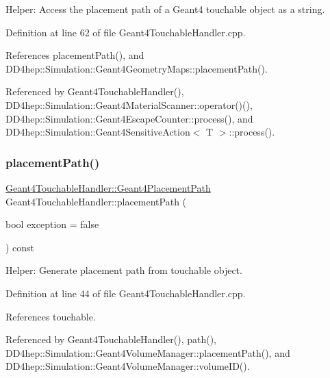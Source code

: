 Helper\+: Access the placement path of a Geant4 touchable object as a string. 



Definition at line 62 of file Geant4\+Touchable\+Handler.\+cpp.



References placement\+Path(), and D\+D4hep\+::\+Simulation\+::\+Geant4\+Geometry\+Maps\+::placement\+Path().



Referenced by Geant4\+Touchable\+Handler(), D\+D4hep\+::\+Simulation\+::\+Geant4\+Material\+Scanner\+::operator()(), D\+D4hep\+::\+Simulation\+::\+Geant4\+Escape\+Counter\+::process(), and D\+D4hep\+::\+Simulation\+::\+Geant4\+Sensitive\+Action$<$ T $>$\+::process().

\hypertarget{class_d_d4hep_1_1_simulation_1_1_geant4_touchable_handler_a2c26cd5e6ac575c7e1a3d95d3f9429b8}{}\label{class_d_d4hep_1_1_simulation_1_1_geant4_touchable_handler_a2c26cd5e6ac575c7e1a3d95d3f9429b8} 
\subsubsection{\texorpdfstring{placement\+Path()}{placementPath()}}
{\footnotesize\ttfamily \hyperlink{class_d_d4hep_1_1_simulation_1_1_geant4_touchable_handler_a3ba887af055edecb3e6cfb04f2c7dc2c}{Geant4\+Touchable\+Handler\+::\+Geant4\+Placement\+Path} Geant4\+Touchable\+Handler\+::placement\+Path (\begin{DoxyParamCaption}\item[{bool}]{exception = {\ttfamily false} }\end{DoxyParamCaption}) const}



Helper\+: Generate placement path from touchable object. 



Definition at line 44 of file Geant4\+Touchable\+Handler.\+cpp.



References touchable.



Referenced by Geant4\+Touchable\+Handler(), path(), D\+D4hep\+::\+Simulation\+::\+Geant4\+Volume\+Manager\+::placement\+Path(), and D\+D4hep\+::\+Simulation\+::\+Geant4\+Volume\+Manager\+::volume\+I\+D().



